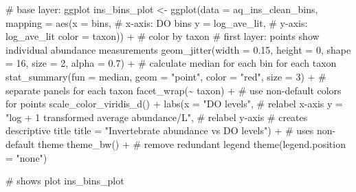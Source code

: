 \documentclass[
  letterpaper,
  DIV=11,
  numbers=noendperiod]{scrartcl}
\newenvironment{Shaded}{\begin{snugshade}}{\end{snugshade}}
\newcommand{\AttributeTok}[1]{\textcolor[rgb]{0.40,0.45,0.13}{#1}}
\newcommand{\CommentTok}[1]{\textcolor[rgb]{0.37,0.37,0.37}{#1}}
\newcommand{\DecValTok}[1]{\textcolor[rgb]{0.68,0.00,0.00}{#1}}
\newcommand{\FloatTok}[1]{\textcolor[rgb]{0.68,0.00,0.00}{#1}}
\newcommand{\FunctionTok}[1]{\textcolor[rgb]{0.28,0.35,0.67}{#1}}
\newcommand{\NormalTok}[1]{\textcolor[rgb]{0.00,0.23,0.31}{#1}}
\newcommand{\OtherTok}[1]{\textcolor[rgb]{0.00,0.23,0.31}{#1}}
\newcommand{\SpecialCharTok}[1]{\textcolor[rgb]{0.37,0.37,0.37}{#1}}
\newcommand{\StringTok}[1]{\textcolor[rgb]{0.13,0.47,0.30}{#1}}
\begin{document}
\begin{Shaded}
\begin{Highlighting}[]
\CommentTok{\# base layer: ggplot}
\NormalTok{ins\_bins\_plot }\OtherTok{\textless{}{-}} \FunctionTok{ggplot}\NormalTok{(}\AttributeTok{data =}\NormalTok{ aq\_ins\_clean\_bins, }
                        \AttributeTok{mapping =} \FunctionTok{aes}\NormalTok{(}\AttributeTok{x =}\NormalTok{ bins, }\CommentTok{\# x{-}axis: DO bins}
                                      \AttributeTok{y =}\NormalTok{ log\_ave\_lit, }\CommentTok{\# y{-}axis: log\_ave\_lit}
                                      \AttributeTok{color =}\NormalTok{ taxon)) }\SpecialCharTok{+} \CommentTok{\# color by taxon}
  \CommentTok{\# first layer: points show individual abundance measurements }
  \FunctionTok{geom\_jitter}\NormalTok{(}\AttributeTok{width =} \FloatTok{0.15}\NormalTok{,}
              \AttributeTok{height =} \DecValTok{0}\NormalTok{,}
              \AttributeTok{shape =} \DecValTok{16}\NormalTok{,}
              \AttributeTok{size =} \DecValTok{2}\NormalTok{,}
            \AttributeTok{alpha =} \FloatTok{0.7}\NormalTok{) }\SpecialCharTok{+}
  \CommentTok{\# calculate median for each bin for each taxon}
  \FunctionTok{stat\_summary}\NormalTok{(}\AttributeTok{fun =}\NormalTok{ median,}
               \AttributeTok{geom =} \StringTok{"point"}\NormalTok{,}
               \AttributeTok{color =} \StringTok{"red"}\NormalTok{,}
               \AttributeTok{size =} \DecValTok{3}\NormalTok{) }\SpecialCharTok{+}
  \CommentTok{\# separate panels for each taxon }
  \FunctionTok{facet\_wrap}\NormalTok{(}\SpecialCharTok{\textasciitilde{}}\NormalTok{ taxon) }\SpecialCharTok{+}
  \CommentTok{\# use non{-}default colors for points}
  \FunctionTok{scale\_color\_viridis\_d}\NormalTok{() }\SpecialCharTok{+}
  \FunctionTok{labs}\NormalTok{(}\AttributeTok{x =} \StringTok{"DO levels"}\NormalTok{, }\CommentTok{\# relabel x{-}axis}
       \AttributeTok{y =} \StringTok{"log + 1 transformed average abundance/L"}\NormalTok{, }\CommentTok{\# relabel y{-}axis}
       \CommentTok{\# creates descriptive title}
       \AttributeTok{title =} \StringTok{"Invertebrate abundance vs DO levels"}\NormalTok{) }\SpecialCharTok{+}
  \CommentTok{\# uses non{-}default theme}
  \FunctionTok{theme\_bw}\NormalTok{() }\SpecialCharTok{+}
  \CommentTok{\# remove redundant legend}
  \FunctionTok{theme}\NormalTok{(}\AttributeTok{legend.position =} \StringTok{"none"}\NormalTok{)}

\CommentTok{\# shows plot}
\NormalTok{ins\_bins\_plot}
\end{Highlighting}
\end{Shaded}
\end{document}
